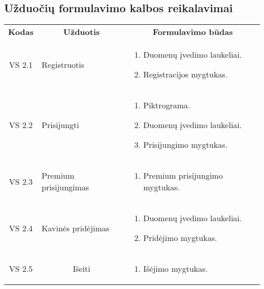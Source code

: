\documentclass{VUMIFPSkursinis}
\begin{document}
\subsection{Užduočių formulavimo kalbos reikalavimai}
\begin{center}

	\begin{longtable}{|p{2cm}|p{}|p{}|}
	\hline
	    \rowcolor{lightgray}
		\multicolumn{3}{|c|}{Užduočių formulavimo kalbos reikalavimai}\\
		
	\hline
		\multicolumn{1}{|c|}{{\bfseries Kodas}}&
		\multicolumn{1}{|c|}{{\bfseries Užduotis}}&
		\multicolumn{1}{|c|}{{\bfseries Formulavimo būdas}}\\		
	\hline
		\multicolumn{1}{|c|}{VS 2.1}& 	
		{Registruotis}&
		\multicolumn{1}{|p{8,6cm}|}{
			\begin{enumerate}
				\item Duomenų įvedimo laukeliai.
				\item Registracijos mygtukas.
			\end{enumerate}}\\
	
	\hline
		\multicolumn{1}{|c|}{VS 2.2}& 	
		{Prisijungti}&
		\multicolumn{1}{|p{8,6cm}|}{
			\begin{enumerate}
				\item Piktrograma. 
				\item Duomenų įvedimo laukeliai.
				\item Prisijungimo  mygtukas.
			\end{enumerate}}\\
	
	\hline
		\multicolumn{1}{|c|}{VS 2.3}& 	
		{Premium prisijungimas}&
		\multicolumn{1}{|p{8,6cm}|}{
			\begin{enumerate}
				\item Premium prisijungimo mygtukas.
			\end{enumerate}}\\
	
	\hline
		\multicolumn{1}{|c|}{VS 2.4}& 	
		{Kavinės pridėjimas}&
		\multicolumn{1}{|p{8,6cm}|}{
			\begin{enumerate}
				\item Duomenų įvedimo laukeliai.
				\item Pridėjimo mygtukas.
			\end{enumerate}}\\
	
	\hline 	
		\multicolumn{1}{|c|}{VS 2.5}&
		\multicolumn{1}{|c|}{Išeiti}&
		\multicolumn{1}{|p{8,6cm}|}{
			\begin{enumerate}
				\item Išėjimo mygtukas.
			\end{enumerate}}\\
	

\end{longtable}
\end{center}
\end{document}
